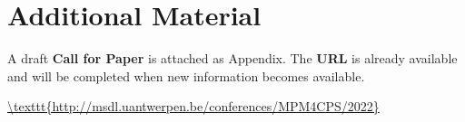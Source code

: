 \section{Additional Material}
\label{sec:Appendix}

A draft \textbf{Call for Paper} is attached as Appendix.
The \textbf{URL} is already available and will be completed when new information
becomes available.

\noindent
\url{\texttt{http://msdl.uantwerpen.be/conferences/MPM4CPS/2022}}

\newpage



